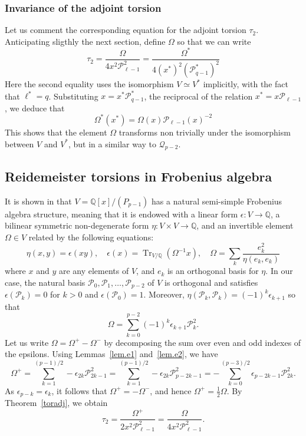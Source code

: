 \documentclass{amsart}
\newcommand{\Q}{\mathbb{Q}}
\DeclareMathOperator{\Tr}{Tr}
\def\calP{\mathcal{P}}
\def\calQ{\mathcal{Q}}
\theoremstyle{definition}
\begin{document}
\subsubsection{Invariance of the adjoint torsion}
Let us comment the corresponding equation for the adjoint torsion $\tau_2$. Anticipating sligthly the next section, define $\Omega$ so that we can write $$\tau_2=\frac{\Omega}{4x^2 \calP_{\ell-1}^2}=\frac{\Omega^\ast}{4(x^\ast)^2(\calP^\ast_{q-1})^2}$$
Here the second equality uses the isomorphism $V\simeq V^\ast$ implicitly, with the fact that $\ell^\ast=q$. Substituting $x=x^\ast \calP^\ast_{q-1}$, the reciprocal of the relation $x^\ast=x \calP_{\ell-1}$, we deduce that
\begin{equation}
    \label{eqn.Omega}
    \Omega^\ast(x^\ast)=\Omega(x)\calP_{\ell-1}(x)^{-2}
\end{equation}
This shows that the element $\Omega$ transforms non trivially under the isomorphism between $V$ and $V^\ast$, but in a similar way to $\calQ_{p-2}$. 


\subsection{Reidemeister torsions in Frobenius algebra}
\label{sec.frob}

It is shown in \cite{S2P} that $V=\Q[x]/(P_{p-1})$ has a natural semi-simple Frobenius algebra structure, meaning that it is endowed with a linear form $\epsilon:V\to \Q$, a bilinear symmetric non-degenerate form $\eta:V\times V\to \Q$, and an invertible element $\Omega\in V$ related by the following equations:
\begin{equation}
    \label{eqn.str}
    \eta(x,y)=\epsilon(xy),\quad \epsilon(x)=\Tr_{V/\Q}(\Omega^{-1}x),\quad \Omega=\sum_{k} \frac{e_k^2}{\eta(e_k,e_k)}
\end{equation}
where $x$ and $y$ are any elements of $V$, and $e_k$ is an orthogonal basis for $\eta$.
In our case, the natural basis $\calP_0,\calP_1,\ldots, \calP_{p-2}$ of $V$ is orthogonal and satisfies $\epsilon(\calP_k)=0$ for $k>0$ and $\epsilon(\calP_0)=1$. Moreover, $\eta(\calP_k,\calP_k)=(-1)^k \epsilon_{k+1}$ so that 
$$\Omega=\sum_{k=0}^{p-2} (-1)^k \epsilon_{k+1} \calP_k^2.$$
Let us write $\Omega=\Omega^+-\Omega^-$ by decomposing the sum over even and odd indexes of the epsilons. Using Lemmas~\ref{lem.e1} and~\ref{lem.e2}, we have
$$\Omega^+=\sum_{k=1}^{(p-1)/2} -\epsilon_{2k} \calP_{2k-1}^2=\sum_{k=1}^{(p-1)/2}-\epsilon_{2k} \calP_{p-2k-1}^2=-\sum_{k=0}^{(p-3)/2}\epsilon_{p-2k-1} \calP_{2k}^2.$$
As $\epsilon_{p-k} = \epsilon_k$, it follows that $\Omega^+ = -\Omega^-$, and hence $\Omega^+ = \tfrac{1}{2}\Omega$.  
By Theorem~\ref{toradj}, we obtain
\begin{equation}\label{toromega}
    \tau_2 = \frac{\Omega^+}{2x^2 \calP_{\ell-1}^2}
           = \frac{\Omega}{4x^2 \calP_{\ell-1}^2}.
\end{equation}
\end{document}
